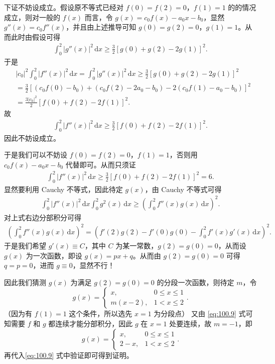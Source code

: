\documentclass[../../main.tex]{subfiles}%
\begin{document}
\begin{remark}
下证不妨设成立。假设原不等式已经对 \(f(0) = f(2) = 0\)，\(f(1) = 1\) 的的情况成立，则对一般的 \(f(x)\) 而言，令 \(g(x) = c_0 f(x) - a_0 x - b_0\)，显然 \(g''(x) = c_0 f''(x)\)，并且由上述推导可知 \(g(0) = g(2) = 0\)，\(g(1) = 1\)。从而此时由假设可得
\begin{align*}
\int_0^2 \left| g''(x) \right|^2 \, \mathrm{d}x \geqslant \frac{3}{2} [g(0) + g(2) - 2g(1)]^2.
\end{align*}
于是
\begin{align*}
&\left| c_0 \right|^2 \int_0^2 \left| f''(x) \right|^2 \, \mathrm{d}x = \int_0^2 \left| g''(x) \right|^2 \, \mathrm{d}x \geqslant \frac{3}{2} \left[ g(0) + g(2) - 2g(1) \right]^2 \\
&= \frac{3}{2} \left[ \left( c_0 f(0) - b_0 \right) + \left( c_0 f(2) - 2a_0 - b_0 \right) - 2 \left( c_0 f(1) - a_0 - b_0 \right) \right]^2 \\
&= \frac{3 \left| c_0 \right|^2}{2} \left[ f(0) + f(2) - 2f(1) \right]^2.
\end{align*}
故
\begin{align*}
\int_0^2 \left| f''(x) \right|^2 \, \mathrm{d}x \geqslant \frac{3}{2} \left[ f(0) + f(2) - 2f(1) \right]^2.
\end{align*}
因此不妨设成立。

于是我们可以不妨设 \(f(0) = f(2) = 0\)，\(f(1) = 1\)，否则用 \(c_0f(x) - a_0x - b_0\) 代替即可。从而只须证
\begin{align*}
\int_0^2 \left| f''(x) \right|^2 \, \mathrm{d}x \geqslant \frac{3}{2} \left[ f(0) + f(2) - 2f(1) \right]^2 = 6.
\end{align*}
显然要利用 Cauchy 不等式，因此待定 \(g(x)\)，由 Cauchy 不等式可得
\begin{align*}
\int_0^2 \left| f''(x) \right|^2 \, \mathrm{d}x \int_0^2 g^2(x) \, \mathrm{d}x \geqslant \left( \int_0^2 f''(x) g(x) \, \mathrm{d}x \right)^2.
\end{align*}
对上式右边分部积分可得
\begin{align}
\left( \int_0^2 f''(x) g(x) \, \mathrm{d}x \right)^2 = \left( f'(2) g(2) - f'(0) g(0) - \int_0^2 f'(x) g'(x) \, \mathrm{d}x \right)^2. \label{eq:100.9}
\end{align}
于是我们希望 \(g'(x) \equiv C\)，其中 \(C\) 为某一常数，\(g(2) = g(0) = 0\)，从而设 \(g(x)\) 为一次函数，即设 \(g(x) = px + q\)。从而由 \(g(2) = g(0) = 0\) 可得 \(q = p = 0\)，进而 \(g \equiv 0\)，显然不行！

因此我们猜测 \(g(x)\) 为满足 \(g(2) = g(0) = 0\) 的分段一次函数，则待定 \(m\)，令
\[
g(x) = 
\begin{cases}
x, & 0 \leqslant x \leqslant 1 \\
m(x - 2), & 1 < x \leqslant 2
\end{cases}.
\]
（因为有 \(f(1) = 1\) 这个条件，所以选先 \(x = 1\) 为分段点）
又由 \eqref{eq:100.9} 式可知需要 \(f\) 和 \(g\) 都连续才能分部积分，因此 \(g\) 在 \(x = 1\) 处要连续，故 \(m = -1\)，即
\[
g(x) = 
\begin{cases}
x, & 0 \leqslant x \leqslant 1 \\
2 - x, & 1 < x \leqslant 2
\end{cases}.
\]
再代入\eqref{eq:100.9} 式中验证即可得到证明。
\end{remark}
\end{document}
